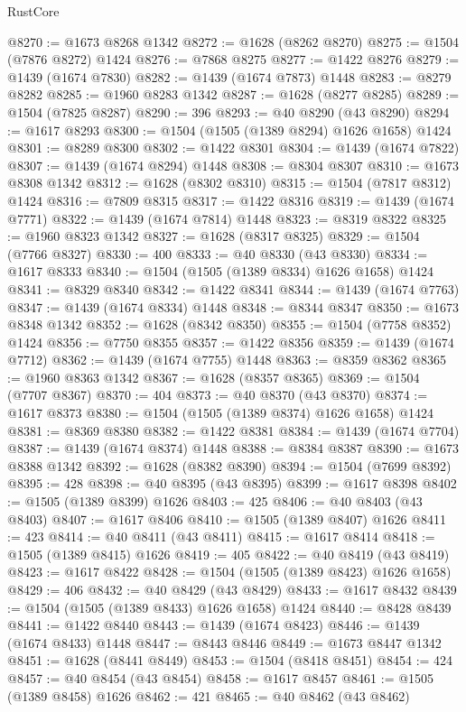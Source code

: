 \begin{lexlean}{RustCore}
\begin{coremodule}
@8270 := @1673 @8268 @1342
@8272 := @1628 (@8262 @8270)
@8275 := @1504 (@7876 @8272) @1424
@8276 := @7868 @8275
@8277 := @1422 @8276
@8279 := @1439 (@1674 @7830)
@8282 := @1439 (@1674 @7873) @1448
@8283 := @8279 @8282
@8285 := @1960 @8283 @1342
@8287 := @1628 (@8277 @8285)
@8289 := @1504 (@7825 @8287)
@8290 := 396
@8293 := @40 @8290 (@43 @8290)
@8294 := @1617 @8293
@8300 := @1504 (@1505 (@1389 @8294) @1626 @1658) @1424
@8301 := @8289 @8300
@8302 := @1422 @8301
@8304 := @1439 (@1674 @7822)
@8307 := @1439 (@1674 @8294) @1448
@8308 := @8304 @8307
@8310 := @1673 @8308 @1342
@8312 := @1628 (@8302 @8310)
@8315 := @1504 (@7817 @8312) @1424
@8316 := @7809 @8315
@8317 := @1422 @8316
@8319 := @1439 (@1674 @7771)
@8322 := @1439 (@1674 @7814) @1448
@8323 := @8319 @8322
@8325 := @1960 @8323 @1342
@8327 := @1628 (@8317 @8325)
@8329 := @1504 (@7766 @8327)
@8330 := 400
@8333 := @40 @8330 (@43 @8330)
@8334 := @1617 @8333
@8340 := @1504 (@1505 (@1389 @8334) @1626 @1658) @1424
@8341 := @8329 @8340
@8342 := @1422 @8341
@8344 := @1439 (@1674 @7763)
@8347 := @1439 (@1674 @8334) @1448
@8348 := @8344 @8347
@8350 := @1673 @8348 @1342
@8352 := @1628 (@8342 @8350)
@8355 := @1504 (@7758 @8352) @1424
@8356 := @7750 @8355
@8357 := @1422 @8356
@8359 := @1439 (@1674 @7712)
@8362 := @1439 (@1674 @7755) @1448
@8363 := @8359 @8362
@8365 := @1960 @8363 @1342
@8367 := @1628 (@8357 @8365)
@8369 := @1504 (@7707 @8367)
@8370 := 404
@8373 := @40 @8370 (@43 @8370)
@8374 := @1617 @8373
@8380 := @1504 (@1505 (@1389 @8374) @1626 @1658) @1424
@8381 := @8369 @8380
@8382 := @1422 @8381
@8384 := @1439 (@1674 @7704)
@8387 := @1439 (@1674 @8374) @1448
@8388 := @8384 @8387
@8390 := @1673 @8388 @1342
@8392 := @1628 (@8382 @8390)
@8394 := @1504 (@7699 @8392)
@8395 := 428
@8398 := @40 @8395 (@43 @8395)
@8399 := @1617 @8398
@8402 := @1505 (@1389 @8399) @1626
@8403 := 425
@8406 := @40 @8403 (@43 @8403)
@8407 := @1617 @8406
@8410 := @1505 (@1389 @8407) @1626
@8411 := 423
@8414 := @40 @8411 (@43 @8411)
@8415 := @1617 @8414
@8418 := @1505 (@1389 @8415) @1626
@8419 := 405
@8422 := @40 @8419 (@43 @8419)
@8423 := @1617 @8422
@8428 := @1504 (@1505 (@1389 @8423) @1626 @1658)
@8429 := 406
@8432 := @40 @8429 (@43 @8429)
@8433 := @1617 @8432
@8439 := @1504 (@1505 (@1389 @8433) @1626 @1658) @1424
@8440 := @8428 @8439
@8441 := @1422 @8440
@8443 := @1439 (@1674 @8423)
@8446 := @1439 (@1674 @8433) @1448
@8447 := @8443 @8446
@8449 := @1673 @8447 @1342
@8451 := @1628 (@8441 @8449)
@8453 := @1504 (@8418 @8451)
@8454 := 424
@8457 := @40 @8454 (@43 @8454)
@8458 := @1617 @8457
@8461 := @1505 (@1389 @8458) @1626
@8462 := 421
@8465 := @40 @8462 (@43 @8462)

\end{coremodule}
\end{lexlean}
